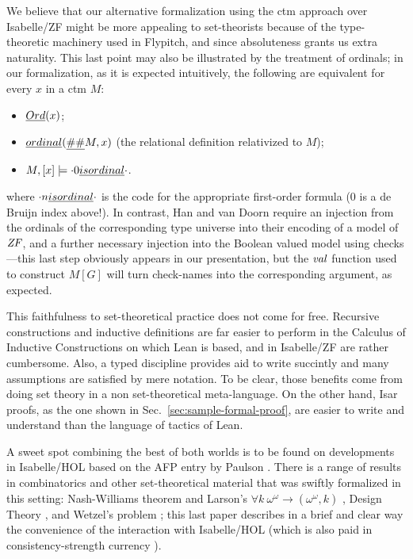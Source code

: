 We believe that our alternative formalization using the ctm approach
over Isabelle/ZF might be more appealing to set-theorists because of the
type-theoretic machinery used in Flypitch, and %
since absoluteness grants us extra naturality. This last point may also
be illustrated by the treatment of ordinals; in our formalization, as
it is expected intuitively, the following are equivalent for every $x$
in a ctm $M$:
\begin{itemize}
\item $\isa{Ord}(x)$;
\item $\isa{ordinal}(\isa{\#\#}M,x)$ (the relational
  definition relativized to $M$);
\item
  $M,[x] \models {\cdot}0\isa{ is ordinal}{\cdot}$.
\end{itemize}
where ${\cdot}n\isa{ is ordinal}{\cdot}$ is the code for the
appropriate first-order formula  ($0$ is a de
Bruijn index above!). In contrast, Han and van Doorn require an
injection from the ordinals of the corresponding type universe into
their encoding of a model of $\mathit{ZF}$, and a further necessary injection into the Boolean
valued model using checks---this last step obviously appears in our
presentation, but the $\operatorname{\mathit{val}}$ function used to construct $M[G]$ will turn
check-names into the corresponding argument, as expected.

This faithfulness to set-theoretical practice does not come for
free. Recursive constructions and inductive definitions are far easier
to perform in the Calculus of Inductive Constructions on which Lean
is based, and in Isabelle/ZF are rather cumbersome. Also, a
typed discipline provides aid to write succintly and many assumptions
are satisfied by mere notation. To be clear, those benefits come from
doing set theory in a non set-theoretical meta-language. On the other
hand, Isar proofs, as the one shown in
Sec.~\ref{sec:sample-formal-proof}, are easier to write and understand
than the language of tactics of Lean.

A sweet spot combining the best of both worlds is to be found on
developments in Isabelle/HOL based on the AFP entry
 by Paulson \cite{ZFC_in_HOL-AFP}. There is a
range of results in combinatorics and other set-theoretical material
that was swiftly formalized in this setting: Nash-Williams theorem and
Larson's $\forall k\ \omega^{\omega}\longrightarrow(\omega^\omega,k)$
\cite{doi:10.1080/10586458.2021.1980464}, Design Theory
\cite{10.1007/978-3-030-81097-9_1}, and Wetzel's problem
\cite{2022arXiv220503159P}; this last paper describes in a brief and
clear way the convenience of the interaction with Isabelle/HOL
(which is also paid in consistency-strength currency
\cite[Sect.~3]{DBLP:conf/ictac/Obua06}).


